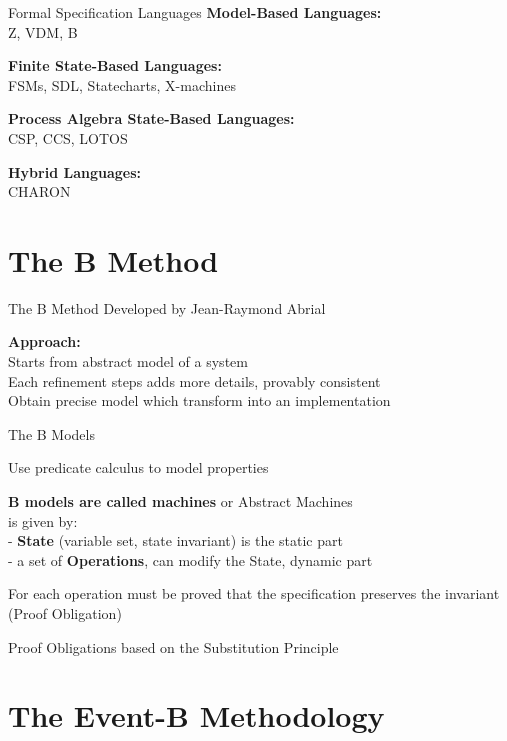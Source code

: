 \documentclass{beamer}
\begin{document}
    \begin{frame}{Formal Specification Languages}
      \textbf{Model-Based Languages:}\\
    Z, VDM, B

    \textbf{Finite State-Based Languages:}\\
    FSMs, SDL, Statecharts, X-machines

    \textbf{Process Algebra State-Based Languages:}\\
    CSP, CCS, LOTOS

    \textbf{Hybrid Languages:}\\
    CHARON
  \end{frame}

  \section{The B Method}
  
  \begin{frame}{The B Method}
    Developed by Jean-Raymond Abrial

    \textbf{Approach:}\\
    Starts from abstract model of a system\\
    Each refinement steps adds more details, provably consistent\\
    Obtain precise model which transform into an implementation


  \end{frame}

  \begin{frame}{The B Models}

    Use predicate calculus to model properties

    \textbf{B models are called machines} or Abstract Machines\\
    is given by:\\
    - \textbf{State} (variable set, state invariant) is the static part\\
    - a set of \textbf{Operations}, can modify the State, dynamic part

    For each operation must be proved that the specification preserves the
    invariant (Proof Obligation)

    Proof Obligations based on the Substitution Principle

  \end{frame}

  \section{The Event-B Methodology}
\end{document}
